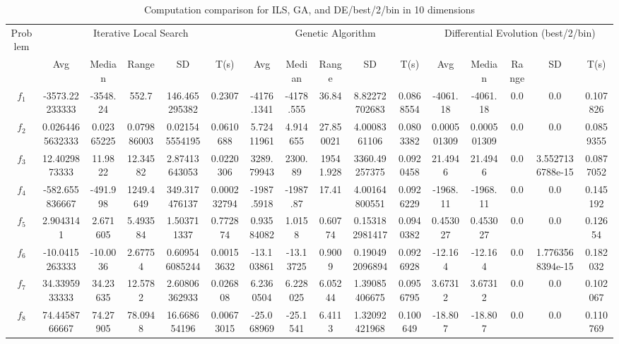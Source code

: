 \documentclass[paper=a4, fontsize=11pt]{scrartcl} %
\numberwithin{equation}{section} %
\numberwithin{figure}{section} %
\numberwithin{table}{section} %
\begin{document}
\begin{landscape}
	\begin{table}
		\tiny
		\centering
		\caption{Computation comparison for ILS, GA, and DE/best/2/bin in 10 dimensions}
		\label{Tab1d}
		\begin{tabular}{c|ccccc|ccccc|ccccc}
			\noalign{\smallskip}\hline\noalign{\smallskip}
			Problem & \multicolumn{5}{c}{Iterative Local Search}& \multicolumn{5}{|c|}{Genetic Algorithm}
			&  \multicolumn{5}{c}{Differential Evolution (best/2/bin)} \\ 
			\noalign{\smallskip}\hline\noalign{\smallskip}
			& Avg & Median & Range & SD & T(s) & Avg & Median
			& Range & SD & T(s) & Avg & Median & Range & SD &
			T(s) \\ 
			\noalign{\smallskip}\hline\noalign{\smallskip}
			$f_{1}$ & -3573.22233333 & -3548.24 & 552.7 & 146.465295382 & 0.2307 & -4176.1341 & -4178.555 & 36.84 & 8.82272702683 & 0.0868554 & -4061.18 & -4061.18 & 0.0 & 0.0 & 0.107826\\
			$f_{2}$ & 0.0264465632333 & 0.02365225 & 0.079886003 & 0.021545554195 & 0.0610688 & 5.72411961 & 4.914655 & 27.850021 & 4.0008361106 & 0.0803382 & 0.000501309 & 0.000501309 & 0.0 & 0.0 & 0.0859355\\
			$f_{3}$ & 12.4029873333 & 11.9822 & 12.34582 & 2.87413643053 & 0.0220306 & 3289.79943 & 2300.89 & 19541.928 & 3360.49257375 & 0.0920458 & 21.4946 & 21.4946 & 0.0 & 3.5527136788e-15 & 0.0877052\\
			$f_{4}$ & -582.655836667 & -491.998 & 1249.4649 & 349.317476137 & 0.000232794 & -1987.5918 & -1987.87 & 17.41 & 4.00164800551 & 0.0926229 & -1968.11 & -1968.11 & 0.0 & 0.0 & 0.145192\\
			$f_{5}$ & 2.9043141 & 2.671605 & 5.493584 & 1.503711337 & 0.772874 & 0.93584082 & 1.0158 & 0.60774 & 0.153182981417 & 0.0940382 & 0.453027 & 0.453027 & 0.0 & 0.0 & 0.12654\\
			$f_{6}$ & -10.0415263333 & -10.0036 & 2.67754 & 0.609546085244 & 0.00153632 & -13.103861 & -13.13725 & 0.9009 & 0.190492096894 & 0.0926928 & -12.164 & -12.164 & 0.0 & 1.7763568394e-15 & 0.182032\\
			$f_{7}$ & 34.3395933333 & 34.23635 & 12.5782 & 2.60806362933 & 0.026808 & 6.2360504 & 6.228025 & 6.05244 & 1.39085406675 & 0.0956795 & 3.67312 & 3.67312 & 0.0 & 0.0 & 0.102067\\
			$f_{8}$ & 74.4458766667 & 74.27905 & 78.0948 & 16.668654196 & 0.00673015 & -25.068969 & -25.1541 & 6.4113 & 1.32092421968 & 0.100649 & -18.807 & -18.807 & 0.0 & 0.0 & 0.110769\\

\end{tabular}
\end{table}
\end{landscape}
\end{document}
